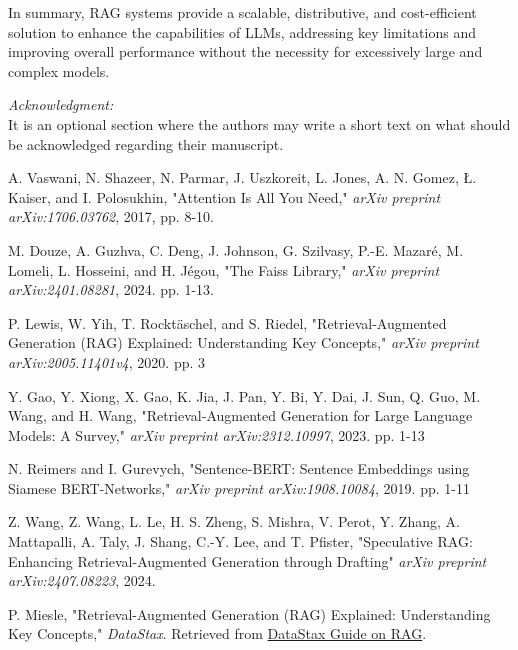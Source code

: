\documentclass{wseas}
\begin{document}
In summary, RAG systems provide a scalable, distributive, and
cost-efficient solution to enhance the capabilities of LLMs, addressing
key limitations and improving overall performance without the necessity
for excessively large and complex models.

\flushleft \par{\textit {Acknowledgment:}}\\
It is an optional section where the authors may write a short text on what should be acknowledged regarding their manuscript.

\begin{thebibliography}{9}

   A. Vaswani, N. Shazeer, N. Parmar, J. Uszkoreit, L. Jones, A. N. Gomez, Ł. Kaiser, and I. Polosukhin, "Attention Is All You Need," \textit{arXiv preprint arXiv:1706.03762}, 2017, pp. 8-10.
  
   M. Douze, A. Guzhva, C. Deng, J. Johnson, G. Szilvasy, P.-E. Mazaré, M. Lomeli, L. Hosseini, and H. Jégou, "The Faiss Library," \textit{arXiv preprint arXiv:2401.08281}, 2024. pp. 1-13.
  
   P. Lewis, W. Yih, T. Rocktäschel, and S. Riedel, "Retrieval-Augmented Generation (RAG) Explained: Understanding Key Concepts," \textit{arXiv preprint arXiv:2005.11401v4}, 2020. pp. 3
  
   Y. Gao, Y. Xiong, X. Gao, K. Jia, J. Pan, Y. Bi, Y. Dai, J. Sun, Q. Guo, M. Wang, and H. Wang, "Retrieval-Augmented Generation for Large Language Models: A Survey," \textit{arXiv preprint arXiv:2312.10997}, 2023. pp. 1-13
  
   N. Reimers and I. Gurevych, "Sentence-BERT: Sentence Embeddings using Siamese BERT-Networks," \textit{arXiv preprint arXiv:1908.10084}, 2019. pp. 1-11
    
   Z. Wang, Z. Wang, L. Le, H. S. Zheng, S. Mishra, V. Perot, Y. Zhang, A. Mattapalli, A. Taly, J. Shang, C.-Y. Lee, and T. Pfister, "Speculative RAG: Enhancing Retrieval-Augmented Generation through Drafting" \textit{arXiv preprint arXiv:2407.08223}, 2024.
  
   P. Miesle, "Retrieval-Augmented Generation (RAG) Explained: Understanding Key Concepts," \textit{DataStax}. Retrieved from \href{https://www.datastax.com/guides/what-is-retrieval-augmented-generation}{DataStax Guide on RAG}.


\end{thebibliography}
\end{document}
